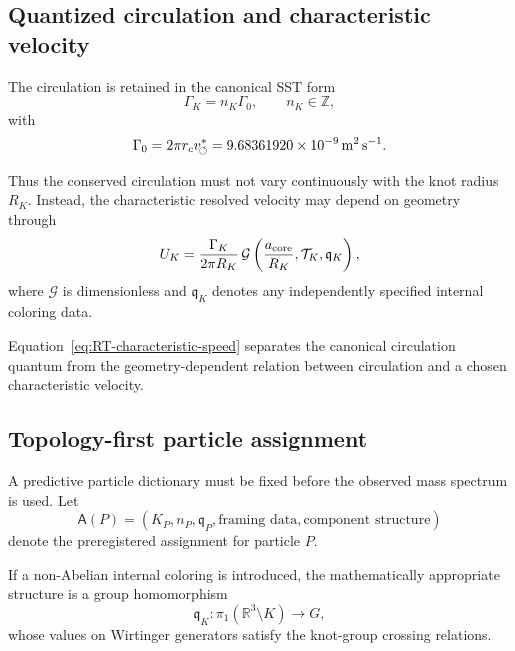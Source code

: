 \subsection{Quantized circulation and characteristic velocity}

The circulation is retained in the canonical SST form
\begin{equation}
\Gamma_K
=
n_K\Gamma_0,
\qquad
n_K\in\mathbb{Z},
\label{eq:RT-circulation-quantization}
\end{equation}
with
\begin{equation}
\Gamma_0
=
2\pi r_cv_{\!\boldsymbol{\circlearrowleft}}^{\ast}
=
9.68361920\times10^{-9}\,
\mathrm{m^2\,s^{-1}}.
\label{eq:RT-circulation-quantum}
\end{equation}

Thus the conserved circulation must not vary continuously with the knot
radius \(R_K\).  Instead, the characteristic resolved velocity may depend
on geometry through
\begin{equation}
U_K
=
\frac{\Gamma_K}{2\pi R_K}
\,
\mathcal{G}
\left(
\frac{a_{\rm core}}{R_K},
\mathcal{T}_K,
\mathfrak{q}_K
\right),
\label{eq:RT-characteristic-speed}
\end{equation}
where \(\mathcal{G}\) is dimensionless and \(\mathfrak{q}_K\) denotes any
independently specified internal coloring data.

Equation~\eqref{eq:RT-characteristic-speed} separates the canonical
circulation quantum from the geometry-dependent relation between circulation
and a chosen characteristic velocity.

\subsection{Topology-first particle assignment}

A predictive particle dictionary must be fixed before the observed mass
spectrum is used.  Let
\begin{equation}
\mathsf{A}(P)
=
\left(
K_P,
n_P,
\mathfrak{q}_P,
\text{framing data},
\text{component structure}
\right)
\label{eq:RT-assignment-map}
\end{equation}
denote the preregistered assignment for particle \(P\).

If a non-Abelian internal coloring is introduced, the mathematically
appropriate structure is a group homomorphism
\begin{equation}
\mathfrak{q}_K:
\pi_1
\left(
\mathbb{R}^3\setminus K
\right)
\longrightarrow
G,
\label{eq:RT-coloring-homomorphism}
\end{equation}
whose values on Wirtinger generators satisfy the knot-group crossing
relations.

